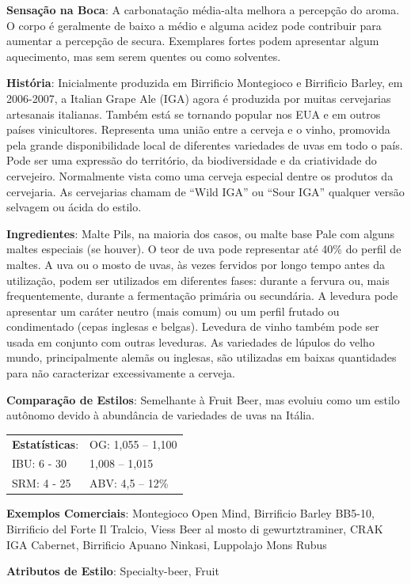 \textbf{Sensação na Boca}: A carbonatação média-alta melhora a percepção do aroma. O corpo é geralmente de baixo a médio e alguma acidez pode contribuir para aumentar a percepção de secura. Exemplares fortes podem apresentar algum aquecimento, mas sem serem quentes ou como solventes.

\textbf{História}: Inicialmente produzida em Birrificio Montegioco e Birrificio Barley, em 2006-2007, a Italian Grape Ale (IGA) agora é produzida por muitas cervejarias artesanais italianas. Também está se tornando popular nos EUA e em outros países vinicultores. Representa uma união entre a cerveja e o vinho, promovida pela grande disponibilidade local de diferentes variedades de uvas em todo o país. Pode ser uma expressão do território, da biodiversidade e da criatividade do cervejeiro. Normalmente vista como uma cerveja especial dentre os produtos da cervejaria. As cervejarias chamam de “Wild IGA” ou “Sour IGA” qualquer versão selvagem ou ácida do estilo.

\textbf{Ingredientes}: Malte Pils, na maioria dos casos, ou malte base Pale com alguns maltes especiais (se houver). O teor de uva pode representar até 40\% do perfil de maltes. A uva ou o mosto de uvas, às vezes fervidos por longo tempo antes da utilização, podem ser utilizados em diferentes fases: durante a fervura ou, mais frequentemente, durante a fermentação primária ou secundária. A levedura pode apresentar um caráter neutro (mais comum) ou um perfil frutado ou condimentado (cepas inglesas e belgas). Levedura de vinho também pode ser usada em conjunto com outras leveduras. As variedades de lúpulos do velho mundo, principalmente alemãs ou inglesas, são utilizadas em baixas quantidades para não caracterizar excessivamente a cerveja.

\textbf{Comparação de Estilos}: Semelhante à Fruit Beer, mas evoluiu como um estilo autônomo devido à abundância de variedades de uvas na Itália.

\begin{tabular}{@{}p{35mm}p{35mm}@{}}
  \textbf{Estatísticas}: & OG: 1,055 – 1,100 \\
  IBU: 6 - 30 & 1,008 – 1,015 \\
  SRM: 4 - 25 & ABV: 4,5 – 12\%
\end{tabular}

\textbf{Exemplos Comerciais}: Montegioco Open Mind, Birrificio Barley BB5-10, Birrificio del Forte Il Tralcio, Viess Beer al mosto di gewurtztraminer, CRAK IGA Cabernet, Birrificio Apuano Ninkasi, Luppolajo Mons Rubus

\textbf{Atributos de Estilo}: Specialty-beer, Fruit
